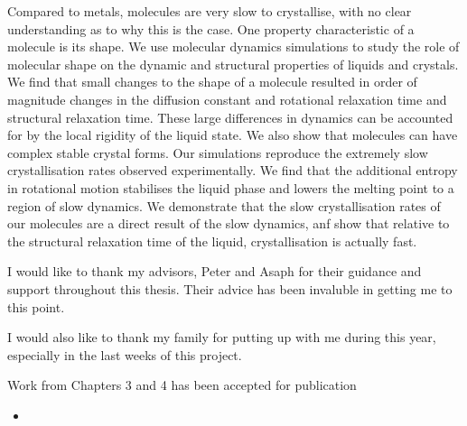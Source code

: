 
\beforepreface


Compared to metals, molecules are very slow to crystallise, with no clear understanding as to why this is the case. One property characteristic of a molecule is its shape. We use molecular dynamics simulations to study the role of molecular shape on the dynamic and structural properties of liquids and crystals. We find that small changes to the shape of a molecule resulted in order of magnitude changes in the diffusion constant and rotational relaxation time and structural relaxation time. These large differences in dynamics can be accounted for by the local rigidity of the liquid state. We also show that molecules can have complex stable crystal forms. Our simulations reproduce the extremely slow crystallisation rates observed experimentally. We find that the additional entropy in rotational motion stabilises the liquid phase and lowers the melting point to a region of slow dynamics. We demonstrate that the slow crystallisation rates of our molecules are a direct result of the slow dynamics, anf show that relative to the structural relaxation time of the liquid, crystallisation is actually fast.


\contributionsignature


I would like to thank my advisors, Peter and Asaph for their guidance and support throughout this thesis. Their advice has been invaluble in getting me to this point.

I would also like to thank my family for putting up with me during this year, especially in the last weeks of this project.


Work from Chapters 3 and 4 has been accepted for publication

\begin{itemize}
    \item {}
\end{itemize}

\afterpreface

